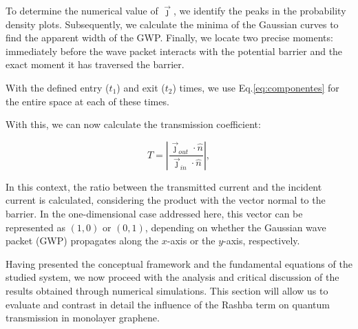 To determine the numerical value of $\vec{\jmath}$, we identify the peaks in the probability density plots.
Subsequently, we calculate the minima of the Gaussian curves to find the apparent width of the GWP. Finally, we locate two precise moments: immediately before the wave packet interacts with the potential barrier and the exact moment it has traversed the barrier.

With the defined entry ($t_1$) and exit ($t_2$) times, we use Eq.\eqref{eq:componentes} for the entire space at each of these times.

With this, we can now calculate the transmission coefficient:

\begin{equation}
    \label{eq:transmissionCoef}
    T = \left| \frac{\vec{\jmath}_{out}\cdot\hat{n}}{\vec{\jmath}_{in}\cdot\hat{n}} \right|,
\end{equation}

\noindent In this context, the ratio between the transmitted current and the incident current is calculated, considering the product with the vector normal to the barrier.
In the one-dimensional case addressed here, this vector can be represented as $(1,0)$ or $(0,1)$, depending on whether the Gaussian wave packet (GWP) propagates along the $x$-axis or the $y$-axis, respectively.

Having presented the conceptual framework and the fundamental equations of the studied system, we now proceed with the analysis and critical discussion of the results obtained through numerical simulations.
This section will allow us to evaluate and contrast in detail the influence of the Rashba term on quantum transmission in monolayer graphene.
